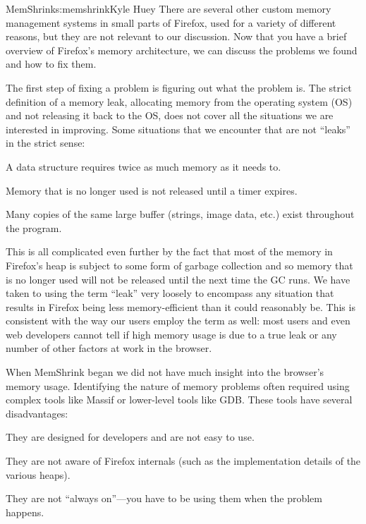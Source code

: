 \begin{aosachapter}{MemShrink}{s:memshrink}{Kyle Huey}
There are several other custom memory management systems in small parts
of Firefox, used for a variety of different reasons, but they are not
relevant to our discussion. Now that you have a brief overview of
Firefox's memory architecture, we can discuss the problems we found and
how to fix them.


The first step of fixing a problem is figuring out what the problem is.
The strict definition of a memory leak, allocating memory from the
operating system (OS) and not releasing it back to the OS, does not
cover all the situations we are interested in improving. Some situations
that we encounter that are not ``leaks'' in the strict sense:

\begin{aosaitemize}

\item
  A data structure requires twice as much memory as it needs to.
\item
  Memory that is no longer used is not released until a timer expires.
\item
  Many copies of the same large buffer (strings, image data, etc.) exist
  throughout the program.
\end{aosaitemize}

This is all complicated even further by the fact that most of the memory
in Firefox's heap is subject to some form of garbage collection and so
memory that is no longer used will not be released until the next time
the GC runs. We have taken to using the term ``leak'' very loosely to
encompass any situation that results in Firefox being less
memory-efficient than it could reasonably be. This is consistent with
the way our users employ the term as well: most users and even web
developers cannot tell if high memory usage is due to a true leak or any
number of other factors at work in the browser.

When MemShrink began we did not have much insight into the browser's
memory usage. Identifying the nature of memory problems often required
using complex tools like Massif or lower-level tools like GDB. These
tools have several disadvantages:

\begin{aosaitemize}

\item
  They are designed for developers and are not easy to use.
\item
  They are not aware of Firefox internals (such as the implementation
  details of the various heaps).
\item
  They are not ``always on''---you have to be using them when the
  problem happens.
\end{aosaitemize}


\end{aosachapter}
